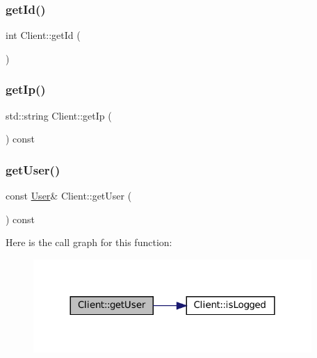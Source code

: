 \mbox{\label{classClient_abc4d8d86cc753596a08a90e359f5eb31}} 
\subsubsection{\texorpdfstring{get\+Id()}{getId()}}
{\footnotesize\ttfamily int Client\+::get\+Id (\begin{DoxyParamCaption}{ }\end{DoxyParamCaption})\hspace{0.3cm}{\ttfamily [inline]}}

\mbox{\label{classClient_ab04ab042f49fd43a6eaeb8df05eb0eae}} 
\subsubsection{\texorpdfstring{get\+Ip()}{getIp()}}
{\footnotesize\ttfamily std\+::string Client\+::get\+Ip (\begin{DoxyParamCaption}{ }\end{DoxyParamCaption}) const\hspace{0.3cm}{\ttfamily [inline]}}

\mbox{\label{classClient_a31da08b532d6585e61d98b563177e33a}} 
\subsubsection{\texorpdfstring{get\+User()}{getUser()}}
{\footnotesize\ttfamily const \mbox{\hyperlink{structUser}{User}}\& Client\+::get\+User (\begin{DoxyParamCaption}{ }\end{DoxyParamCaption}) const\hspace{0.3cm}{\ttfamily [inline]}}

Here is the call graph for this function\+:
\nopagebreak
\begin{figure}[H]
\begin{center}
\leavevmode
\includegraphics[width=300pt]{classClient_a31da08b532d6585e61d98b563177e33a_cgraph}
\end{center}
\end{figure}
\mbox{\label{classClient_afcbe6046c74e86b64c1b861f5e58ffbd}} 
